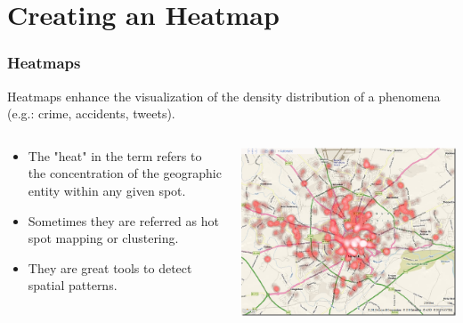 \documentclass[hyperref={pdfpagelabels=true}]{beamer}
\begin{document}
\section{Creating an Heatmap} 
\begin{frame}
\frametitle{Heatmaps}

Heatmaps enhance the visualization of the density distribution of a phenomena (e.g.: crime, accidents, tweets).
\begin{columns}
  \begin{column}{0.5\textwidth}
    \begin{itemize}
	  \item<2->The "heat" in the term refers to the concentration of the geographic entity within any given spot.
	  \item<3->Sometimes they are referred as hot spot mapping or clustering.
	  \item<4->They are great tools to detect spatial patterns.
    \end{itemize}
  \end{column}
  \begin{column}{0.5\textwidth}
    \includegraphics[width=\textwidth]{heatmap_crime.png}    
  \end{column}  
\end{columns}
\end{frame}
\end{document}
